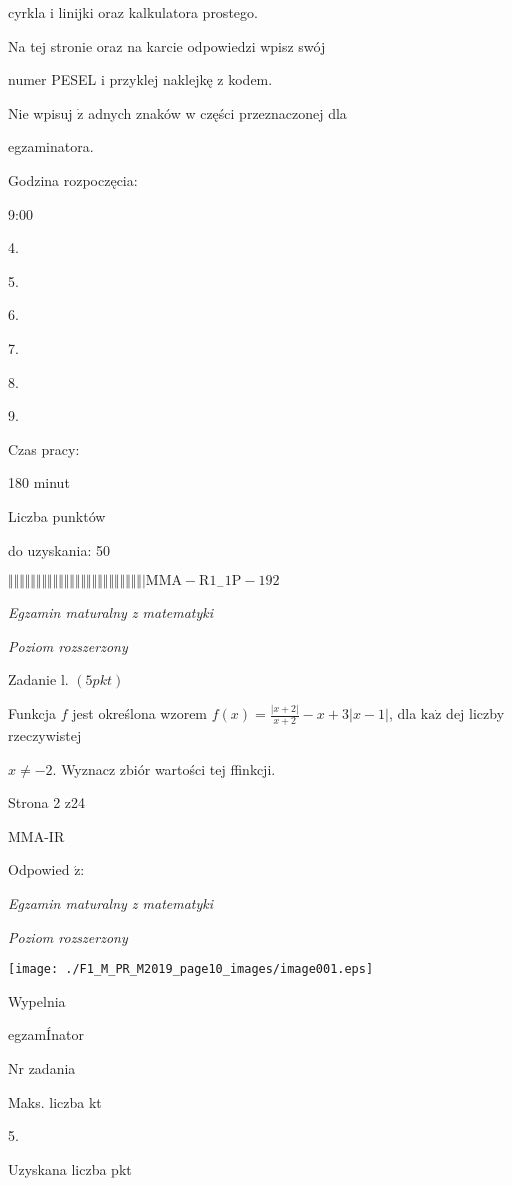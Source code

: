 \documentclass[a4paper,12pt]{article}
\begin{document}
cyrkla i linijki oraz kalkulatora prostego.

Na tej stronie oraz na karcie odpowiedzi wpisz swój

numer PESEL i przyklej naklejkę z kodem.

Nie wpisuj $\dot{\mathrm{z}}$ adnych znaków w części przeznaczonej dla

egzaminatora.

Godzina rozpoczęcia:

9:00

4.

5.

6.

7.

8.

9.

Czas pracy:

180 minut

Liczba punktów

do uzyskania: 50

$\Vert\Vert\Vert\Vert\Vert\Vert\Vert\Vert\Vert\Vert\Vert\Vert\Vert\Vert\Vert\Vert\Vert\Vert\Vert\Vert\Vert\Vert\Vert\Vert|  \mathrm{M}\mathrm{M}\mathrm{A}-\mathrm{R}1_{-}1\mathrm{P}-192$




{\it Egzamin maturalny z matematyki}

{\it Poziom rozszerzony}

Zadanie l. $(5pkt)$

Funkcja $f$ jest określona wzorem $f(x)=\displaystyle \frac{|x+2|}{x+2}-x+3|x-1|$, dla $\mathrm{k}\mathrm{a}\dot{\mathrm{z}}$ dej liczby rzeczywistej

$x\neq-2$. Wyznacz zbiór wartości tej ffinkcji.

Strona 2 z24

MMA-IR





Odpowied $\acute{\mathrm{z}}$:

{\it Egzamin maturalny z matematyki}

{\it Poziom rozszerzony}
\begin{center}
\texttt{[image: ./F1\_M\_PR\_M2019\_page10\_images/image001.eps]}
\end{center}
Wypelnia

egzamÍnator

Nr zadania

Maks. liczba kt

5.

Uzyskana liczba pkt
\end{document}
